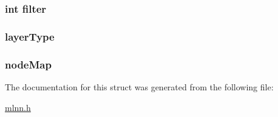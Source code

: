 \subsubsection[{filter}]{\setlength{\rightskip}{0pt plus 5cm}int filter}\label{struct_layer_definition_af0122ee4312107103b580a98c74a4ea6}
\hypertarget{struct_layer_definition_a0c96bb06d0bfebab22c9cc28fdb27184}{}
\subsubsection[{layer\+Type}]{ layer\+Type}\label{struct_layer_definition_a0c96bb06d0bfebab22c9cc28fdb27184}
\hypertarget{struct_layer_definition_a8cd81e74b0e3a0cfb1a4608fcbf72b38}{}
\subsubsection[{node\+Map}]{ node\+Map}\label{struct_layer_definition_a8cd81e74b0e3a0cfb1a4608fcbf72b38}


The documentation for this struct was generated from the following file\+:\begin{DoxyCompactItemize}
\item 
\hyperlink{mlnn_8h}{mlnn.\+h}\end{DoxyCompactItemize}
